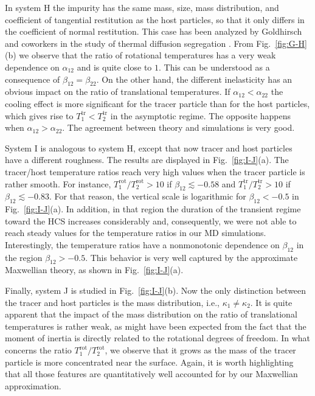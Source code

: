 \documentclass[aps,pre,reprint]{revtex4-1}
\newcommand{\Tt}{T^{\text{tr}}}
\newcommand{\Tr}{T^{\text{rot}}}
\begin{document}
In system H the impurity has the same mass, size, mass distribution, and coefficient of tangential restitution as the host particles, so that it only differs in the coefficient of normal restitution. This case has been analyzed by Goldhirsch and coworkers \cite{SGNT06,SNTG09} in the study of thermal diffusion segregation \cite{G11}. {}From Fig.\ \ref{fig:G-H}(b) we observe that the ratio of rotational temperatures has a very weak dependence on $\alpha_{12}$ and is quite close to $1$. This can be understood as a consequence of $\beta_{12}=\beta_{22}$. On the other hand, the different inelasticity has an obvious impact on the  ratio of translational temperatures. If $\alpha_{12}<\alpha_{22}$ the cooling effect is more significant for the tracer particle than for the host particles, which gives rise to $\Tt_1<\Tt_2$ in the asymptotic regime. The opposite happens when $\alpha_{12}>\alpha_{22}$. The agreement between theory and simulations is very good.

System I is analogous to system H, except that now  tracer and host particles have a different roughness. The results are displayed in Fig.\ \ref{fig:I-J}(a). The tracer/host temperature ratios reach very high values when the tracer particle is rather smooth. For instance, $\Tr_1/\Tr_2>10$ if $\beta_{12}\lesssim -0.58$ and $\Tt_1/\Tt_2>10$ if $\beta_{12}\lesssim -0.83$. For that reason, the vertical scale is logarithmic for $\beta_{12}<-0.5$ in Fig.\ \ref{fig:I-J}(a). In addition, in that region the duration of the transient regime toward the HCS increases considerably and, consequently, we were not able to reach steady values for the temperature ratios in our MD simulations. Interestingly, the temperature ratios have a nonmonotonic dependence on $\beta_{12}$ in the region $\beta_{12}>-0.5$. This behavior is very well captured by the approximate Maxwellian theory, as shown in Fig.\ \ref{fig:I-J}(a).

Finally, system J is studied in Fig.\ \ref{fig:I-J}(b). Now the only distinction between the tracer and host particles is the mass distribution, i.e., $\kappa_1\neq \kappa_2$. It is quite apparent that the impact of the mass distribution on the ratio of translational temperatures is rather weak, as might have been expected from the fact that the moment of inertia is directly related to the rotational degrees of freedom. In what concerns the ratio $\Tr_1/\Tr_2$, we observe that it grows as the mass of the tracer particle is more concentrated near the surface. Again, it  is worth highlighting  that all those features are quantitatively well accounted for by our Maxwellian approximation.
\end{document}
